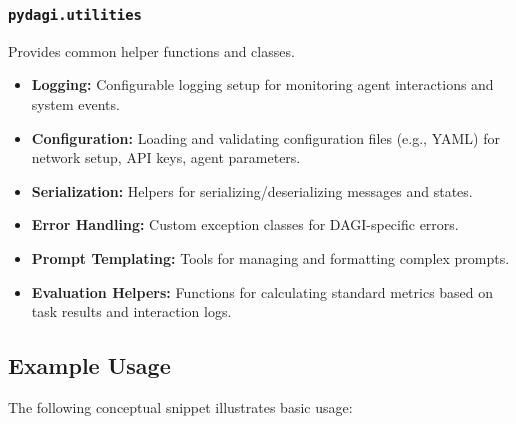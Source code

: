 \documentclass[12pt]{amsart}
\begin{document}
\subsubsection{\texttt{pydagi.utilities}}
Provides common helper functions and classes.
\begin{itemize}[leftmargin=*]
    \item \textbf{Logging:} Configurable logging setup for monitoring agent interactions and system events.
    \item \textbf{Configuration:} Loading and validating configuration files (e.g., YAML) for network setup, API keys, agent parameters.
    \item \textbf{Serialization:} Helpers for serializing/deserializing messages and states.
    \item \textbf{Error Handling:} Custom exception classes for DAGI-specific errors.
    \item \textbf{Prompt Templating:} Tools for managing and formatting complex prompts.
    \item \textbf{Evaluation Helpers:} Functions for calculating standard metrics based on task results and interaction logs.
\end{itemize}

\subsection{Example Usage}
The following conceptual snippet illustrates basic usage:
\end{document}
